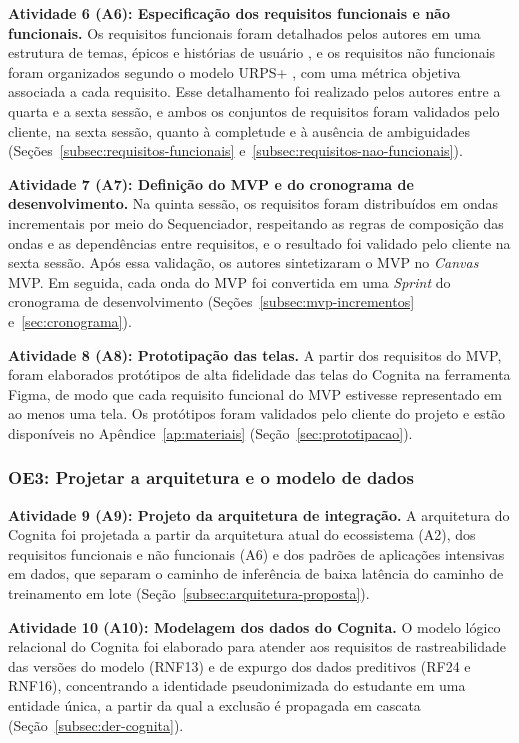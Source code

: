 \textbf{Atividade 6 (A6): Especificação dos requisitos funcionais e não funcionais.} Os requisitos funcionais foram detalhados pelos autores em uma estrutura de temas, épicos e histórias de usuário \cite{cohn_user_2004}, e os requisitos não funcionais foram organizados segundo o modelo URPS+ \cite{pressman_engenharia_2021}, com uma métrica objetiva associada a cada requisito. Esse detalhamento foi realizado pelos autores entre a quarta e a sexta sessão, e ambos os conjuntos de requisitos foram validados pelo cliente, na sexta sessão, quanto à completude e à ausência de ambiguidades (Seções~\ref{subsec:requisitos-funcionais} e~\ref{subsec:requisitos-nao-funcionais}).

\textbf{Atividade 7 (A7): Definição do MVP e do cronograma de desenvolvimento.} Na quinta sessão, os requisitos foram distribuídos em ondas incrementais por meio do Sequenciador, respeitando as regras de composição das ondas e as dependências entre requisitos, e o resultado foi validado pelo cliente na sexta sessão. Após essa validação, os autores sintetizaram o MVP no \textit{Canvas} MVP. Em seguida, cada onda do MVP foi convertida em uma \textit{Sprint} do cronograma de desenvolvimento \cite{schwaber_scrum_2020} (Seções~\ref{subsec:mvp-incrementos} e~\ref{sec:cronograma}).

\textbf{Atividade 8 (A8): Prototipação das telas.} A partir dos requisitos do MVP, foram elaborados protótipos de alta fidelidade das telas do Cognita na ferramenta Figma, de modo que cada requisito funcional do MVP estivesse representado em ao menos uma tela. Os protótipos foram validados pelo cliente do projeto e estão disponíveis no Apêndice~\ref{ap:materiais} (Seção~\ref{sec:prototipacao}).

\subsubsection{OE3: Projetar a arquitetura e o modelo de dados}
\label{subsubsec:oe3}

\textbf{Atividade 9 (A9): Projeto da arquitetura de integração.} A arquitetura do Cognita foi projetada a partir da arquitetura atual do ecossistema (A2), dos requisitos funcionais e não funcionais (A6) e dos padrões de aplicações intensivas em dados, que separam o caminho de inferência de baixa latência do caminho de treinamento em lote \cite{kleppmann_designing_2017} (Seção~\ref{subsec:arquitetura-proposta}).

\textbf{Atividade 10 (A10): Modelagem dos dados do Cognita.} O modelo lógico relacional do Cognita foi elaborado para atender aos requisitos de rastreabilidade das versões do modelo (RNF13) e de expurgo dos dados preditivos (RF24 e RNF16), concentrando a identidade pseudonimizada do estudante em uma entidade única, a partir da qual a exclusão é propagada em cascata (Seção~\ref{subsec:der-cognita}).

